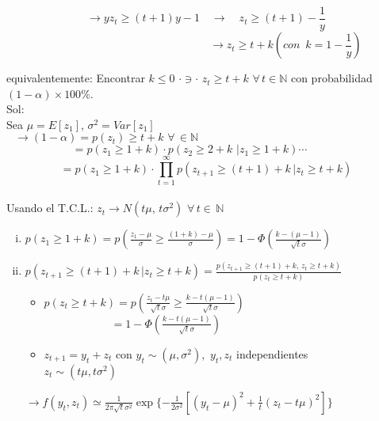 $$\rightarrow y z_t\ge (t+1)y-1\quad\rightarrow\quad z_t\ge(t+1)-\frac{1}{y}$$
$$\qquad\qquad\qquad\qquad\qquad\qquad\qquad\,\,\rightarrow z_t\ge t+k (con\,\,\,k=1-\frac{1}{y})$$

equivalentemente: Encontrar $k\le 0\,\,\cdot\ni\cdot\,\,z_t\ge t+k\,\,\forall\,t\in\mathbb{N}$ con probabilidad $(1-\alpha)\times 100\%$.\\

Sol: \\
Sea $\mu=E[z_1]$, $\sigma^2=Var[z_1]$\\

\[\rightarrow (1-\alpha)=p(z_t)\ge t+k\,\,\forall\,\in\mathbb{N}\qquad\qquad\qquad\qquad\qquad\qquad\qquad\qquad\quad\quad\]
\[=p(z_1\ge 1+k)\cdot p(z_2\ge 2+k\,\,|z_1\ge 1+k)\cdots\qquad\quad\]
\[=p(z_1\ge 1+k)\cdot\displaystyle\prod_{t=1}^{\infty}p(z_{t+1}\ge (t+1)+k\,|z_t\ge t+k)\]\\

Usando el T.C.L.: $z_t \rightarrow N(t\mu,\,t\sigma^2)\,\,\forall\,t\in\,\mathbb{N}$

\begin{enumerate}[(i)]
 \item $p(z_1\ge 1+k)=p{\displaystyle\left(\frac{z_1-\mu}{\sigma}\ge\frac{(1+k)-\mu}{\sigma}\right)=1-\Phi\left(\frac{k-(\mu-1)}{\sqrt{t}\sigma}\right)}$\\
 
 \item $p(z_{t+1}\ge (t+1)+k\,|z_t\ge t+k)=\displaystyle\frac{p(z_{t+1}\ge (t+1)+k,\,z_t\ge t+k)}{p(z_t\ge t+k)}$\\
 
    \begin{itemize}
     \item $p(z_t\ge t+k)=p{\displaystyle\left(\frac{z_t-t\mu}{\sqrt{t}\sigma}\ge\frac{k-t(\mu-1)}{\sqrt{t}\sigma}\right)}$\\
     
     $\qquad\qquad\qquad={\displaystyle 1-\Phi\left(\frac{k-t(\mu-1)}{\sqrt{t}\sigma}\right)}$\\
     
     \item $z_{t+1}=y_t+z_t$ con $y_t \sim (\mu,\sigma^2),\,\,y_t,z_t$ independientes\\ $z_t\sim(t\mu,t\sigma^2)$
    \end{itemize}
$\rightarrow f(y_t,z_t)\simeq \displaystyle\frac{1}{2\pi\sqrt{t}\sigma^2}\exp\{-\frac{1}{2\sigma^2}[(y_t-\mu)^2+\frac{1}{t}(z_t-t\mu)^2]\}$
\end{enumerate}

